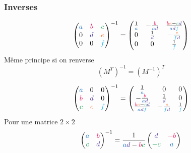 \documentclass[]{article}
\begin{document}
\begin{multicols}{3}
\subsubsection{Inverses}
$$\begin{pmatrix}
\textcolor{RoyalBlue}{a} & \textcolor{OrangeRed}{b} & \textcolor{ForestGreen}{c}\\
0 & \textcolor{Violet}{d} & \textcolor{Orange}{e}\\
0 & 0 & \textcolor{ProcessBlue}{f}
\end{pmatrix}^{-1}=\begin{pmatrix}
\frac{1}{\textcolor{RoyalBlue}{a}} & -\frac{\textcolor{OrangeRed}{b}}{\textcolor{RoyalBlue}{a}\textcolor{Violet}{d}} & \frac{\textcolor{OrangeRed}{b}\textcolor{Orange}{e}-\textcolor{ForestGreen}{c}\textcolor{Violet}{d}}{\textcolor{RoyalBlue}{a}\textcolor{Violet}{d}\textcolor{ProcessBlue}{f}}\\
0 & \frac{1}{\textcolor{Violet}{d}} & -\frac{\textcolor{Orange}{e}}{\textcolor{ProcessBlue}{f}\textcolor{Violet}{d}}\\
0 & 0 & \frac{1}{\textcolor{ProcessBlue}{f}}
\end{pmatrix}$$
Même principe si on renverse
$$\left(M^{T}\right)^{-1}=\left(M^{-1}\right)^{T}$$

$$\begin{pmatrix}
\textcolor{RoyalBlue}{a} & 0 & 0\\
\textcolor{OrangeRed}{b} & \textcolor{Violet}{d} & 0\\
\textcolor{ForestGreen}{c} & \textcolor{Orange}{e} & \textcolor{ProcessBlue}{f}
\end{pmatrix}^{-1}=\begin{pmatrix}
\frac{1}{\textcolor{RoyalBlue}{a}} & 0 & 0\\
-\frac{\textcolor{OrangeRed}{b}}{\textcolor{RoyalBlue}{a}\textcolor{Violet}{d}} & \frac{1}{\textcolor{Violet}{d}} & 0\\
\frac{\textcolor{OrangeRed}{b}\textcolor{Orange}{e}-\textcolor{ForestGreen}{c}\textcolor{Violet}{d}}{\textcolor{RoyalBlue}{a}\textcolor{Violet}{d}\textcolor{ProcessBlue}{f}} & -\frac{\textcolor{Orange}{e}}{\textcolor{ProcessBlue}{f}\textcolor{Violet}{d}} &
\frac{1}{\textcolor{ProcessBlue}{f}}
\end{pmatrix}$$
Pour une matrice $2\times 2$
$$\begin{pmatrix}
\textcolor{RoyalBlue}{a} & \textcolor{OrangeRed}{b}\\
\textcolor{ForestGreen}{c} & \textcolor{Violet}{d}
\end{pmatrix}^{-1}=\frac{1}{\textcolor{RoyalBlue}{a}\textcolor{Violet}{d}-\textcolor{OrangeRed}{b}\textcolor{ForestGreen}{c}}\begin{pmatrix}
\textcolor{Violet}{d} & \textcolor{OrangeRed}{-b}\\
\textcolor{ForestGreen}{-c} & \textcolor{RoyalBlue}{a}
\end{pmatrix}$$


\end{multicols}
\end{document}
